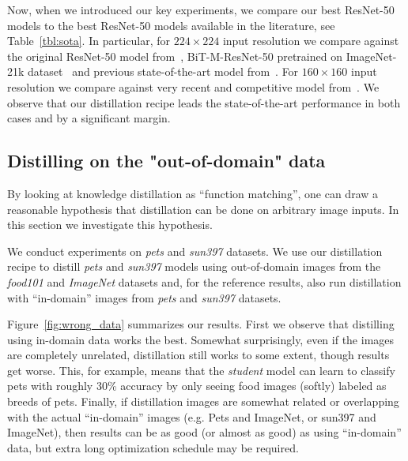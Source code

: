 \documentclass[10pt,twocolumn,letterpaper]{article}
\begin{document}
Now, when we introduced our key experiments, we compare our best ResNet-50 models to the best ResNet-50 models available in the literature, see Table~\ref{tbl:sota}. In particular, for $224 \times 224$ input resolution we compare against the original ResNet-50 model from~\cite{he2016deep}, BiT-M-ResNet-50 pretrained on ImageNet-21k dataset~\cite{russakovsky2015imagenet} and previous state-of-the-art model from~\cite{shen2020mealv2}. For $160 \times 160$ input resolution we compare against very recent and competitive model from~\cite{bello2021revisiting}. We observe that our distillation recipe leads the state-of-the-art performance in both cases and by a significant margin.

\subsection{Distilling on the "out-of-domain" data}

By looking at knowledge distillation as ``function matching'', one can draw a reasonable hypothesis that distillation can be done on arbitrary image inputs. In this section we investigate this hypothesis.

We conduct experiments on \emph{pets} and \emph{sun397} datasets. We use our distillation recipe to distill \emph{pets} and \emph{sun397} models using out-of-domain images from the \emph{food101} and \emph{ImageNet} datasets and, for the reference results, also run distillation with ``in-domain'' images from \emph{pets} and \emph{sun397} datasets.

Figure~\ref{fig:wrong_data} summarizes our results. First we observe that distilling using in-domain data works the best. Somewhat surprisingly, even if the images are completely unrelated, distillation still works to some extent, though results get worse. This, for example, means that the \emph{student} model can learn to classify pets with roughly 30\% accuracy by only seeing food images (softly) labeled as breeds of pets. 
Finally, if distillation images are somewhat related or overlapping with the actual ``in-domain'' images (e.g. Pets and ImageNet, or sun397 and ImageNet), then results can be as good (or almost as good) as using ``in-domain'' data, but extra long optimization schedule may be required. 
\end{document}
